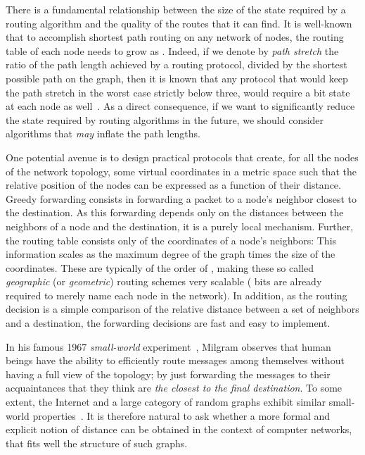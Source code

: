 \documentclass[conference]{IEEEtran}
\begin{document}
There is a fundamental relationship between the size of the state required by a routing algorithm and the quality of the routes that it can find. It is well-known that to accomplish shortest path routing on any network of  nodes, the routing table of each node needs to grow as . Indeed, if we denote by {\em path stretch} the ratio of the path length achieved by a routing protocol, divided by the shortest possible path on the graph, then it is known that any protocol that would keep the path stretch in the worst case strictly below three, would require a  bit state at each node as well~\cite{gavoille97}.
As a direct consequence, if we want to significantly reduce the state required by routing algorithms in the future, we should consider algorithms that \emph{may} inflate the path lengths.






One potential avenue is to design practical protocols that create, for all the nodes of the network topology, some virtual coordinates in a metric space such that the relative position of the nodes can be expressed as a function of their distance. Greedy forwarding consists in forwarding a packet to a node's neighbor closest to the destination. As this forwarding depends only on the distances between the neighbors of a node and the destination, it is a purely local mechanism. Further, the routing table consists only of the coordinates of a node's neighbors: This information scales as the maximum degree of the graph times the size of the coordinates. These are typically of the order of , making these so called {\em geographic} (or {\em geometric}) routing schemes very scalable ( bits are already required to merely name each node in the network). In addition, as the routing decision is a simple comparison of the relative distance between a set of neighbors and a destination, the forwarding decisions are fast and easy to implement.

In his famous 1967 \emph{small-world} experiment~\cite{milgram67smallworld}, Milgram observes that human beings have the ability to efficiently route messages among themselves without having a full view of the topology; by just forwarding the messages to their acquaintances that they think are \emph{the closest to the final destination}. To some extent, the Internet and a large category of random graphs exhibit similar small-world properties~\cite{pastor-satorras04}. It is therefore natural to ask whether a more formal and explicit notion of distance can be obtained in the context of computer networks, that fits well the structure of such graphs.
\end{document}
